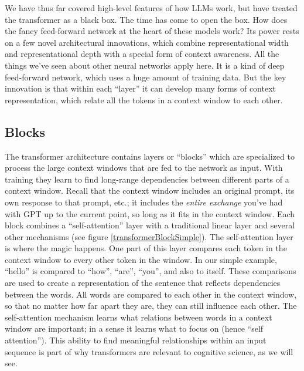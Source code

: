 We have thus far covered high-level features of how LLMs work, but have treated the transformer as a black box.  The time has come to open the box. How does the fancy feed-forward network at the heart of these models work? Its power rests on a few novel architectural innovations, which combine representational width and representational depth with a special form of context awareness. All the things we've seen about other neural networks apply here. It is a kind of deep feed-forward network, which uses a huge amount of training data. But the key innovation is that within each ``layer'' it can develop many forms of context representation, which relate all the tokens in a context window to each other.

\subsection{Blocks}


The transformer architecture \cite{vaswani2017attention} contains layers or ``blocks'' which are specialized to process the large context windows that are fed to the network as input. With training they learn to find long-range dependencies between different parts of a context window. Recall that the context window  includes an original prompt, its own response to that prompt, etc.; it includes the \emph{entire exchange} you've had with GPT up to the current point, so long as it fits in the context window. Each block combines  a ``self-attention'' layer with a traditional linear layer and several other mechanisms (see figure \ref{transformerBlockSimple}). The self-attention layer is where the magic happens. One part of this layer compares each token in the context window to every other token in the window. In our simple example, ``hello'' is compared to ``how'', ``are'',  ``you'', and also to itself. These comparisons are used to create a representation of the sentence that reflects dependencies between the words. All words are compared to each other in the context window, so that no matter how far apart they are, they can still influence each other. The self-attention mechanism learns what relations between words in a context window are important; in a sense it learns what to focus on (hence ``self attention''). This ability to find meaningful relationships within an input sequence is part of why transformers are relevant to cognitive science, as we will see.

